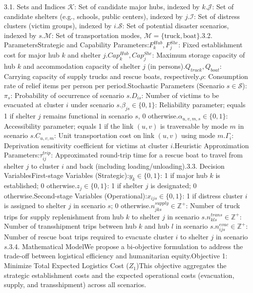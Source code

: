 {3.1. Sets and Indices
$\mathcal{K}$: Set of candidate major hubs, indexed by $k$.$\mathcal{J}$: Set of candidate shelters (e.g., schools, public centers), indexed by $j$.$\mathcal{I}$: Set of distress clusters (victim groups), indexed by $i$.$\mathcal{S}$: Set of potential disaster scenarios, indexed by $s$.$\mathcal{M}$: Set of transportation modes, $\mathcal{M} = \{ \text{truck}, \text{boat} \}$.3.2. ParametersStrategic and Capability Parameters:$F_k^{Hub}, F_j^{She}$: Fixed establishment cost for major hub $k$ and shelter $j$.$Cap_k^{Hub}, Cap_j^{She}$: Maximum storage capacity of hub $k$ and accommodation capacity of shelter $j$ (in persons).$Q_{truck}, Q_{boat}$: Carrying capacity of supply trucks and rescue boats, respectively.$\rho$: Consumption rate of relief items per person per period.Stochastic Parameters (Scenario $s \in \mathcal{S}$):$\pi_s$: Probability of occurrence of scenario $s$.$D_{is}$: Number of victims to be evacuated at cluster $i$ under scenario $s$.$\beta_{js} \in \{0,1\}$: Reliability parameter; equals 1 if shelter $j$ remains functional in scenario $s$, 0 otherwise.$\alpha_{u,v,m,s} \in \{0,1\}$: Accessibility parameter; equals 1 if the link $(u,v)$ is traversable by mode $m$ in scenario $s$.$C_{u,v,m}$: Unit transportation cost on link $(u,v)$ using mode $m$.$\Gamma_i$: Deprivation sensitivity coefficient for victims at cluster $i$.Heuristic Approximation Parameters:$\tau_{ij}^{trip}$: Approximated round-trip time for a rescue boat to travel from shelter $j$ to cluster $i$ and back (including loading/unloading).3.3. Decision VariablesFirst-stage Variables (Strategic):$y_k \in \{0,1\}$: 1 if major hub $k$ is established; 0 otherwise.$z_j \in \{0,1\}$: 1 if shelter $j$ is designated; 0 otherwise.Second-stage Variables (Operational):$x_{ijs} \in \{0,1\}$: 1 if distress cluster $i$ is assigned to shelter $j$ in scenario $s$; 0 otherwise.$n_{jks}^{supply} \in \mathbb{Z}^+$: Number of truck trips for supply replenishment from hub $k$ to shelter $j$ in scenario $s$.$n_{kls}^{trans} \in \mathbb{Z}^+$: Number of transshipment trips between hub $k$ and hub $l$ in scenario $s$.$n_{ijs}^{evac} \in \mathbb{Z}^+$: Number of rescue boat trips required to evacuate cluster $i$ to shelter $j$ in scenario $s$.3.4. Mathematical ModelWe propose a bi-objective formulation to address the trade-off between logistical efficiency and humanitarian equity.Objective 1: Minimize Total Expected Logistics Cost ($Z_1$)This objective aggregates the strategic establishment costs and the expected operational costs (evacuation, supply, and transshipment) across all scenarios.$$\begin{aligned}

\end{aligned}$$}
